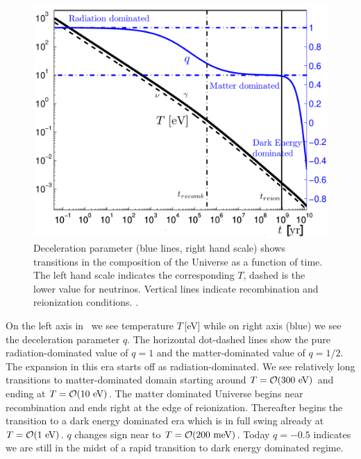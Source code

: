 \begin{figure}
\centerline{\includegraphics[width=0.90\linewidth]{01-introduction/Figures/Tqtoday.png}}
\caption{Deceleration parameter (blue lines, right hand scale) shows transitions in the composition of the Universe as a function of time. The left hand scale indicates the corresponding $T$, dashed is the lower value for neutrinos. Vertical lines indicate recombination and reionization conditions. .
\label{fig:today} }
\end{figure}

On the left axis in~ we see temperature $T$\,[eV] while on right axis (blue) we see the deceleration parameter $q$. The horizontal dot-dashed lines show the pure radiation-dominated value of $q=1$ and the matter-dominated value of $q=1/2$. The expansion in this era starts off as radiation-dominated. We see relatively long transitions to matter-dominated domain starting around $T=\mathcal{O}(300\text{ eV})$ and ending at $T=\mathcal{O}(10\text{ eV})$. The matter dominated Universe begins near recombination and ends right at the edge of reionization. Thereafter begins the transition to a dark energy dominated era which is in full swing already at $T=\mathcal{O}(1\text{ eV})$. $q$ changes sign near to $T=\mathcal{O}(200\text{ meV})$. Today $q=-0.5$ indicates we are still in the midst of a rapid transition to dark energy dominated regime. 

